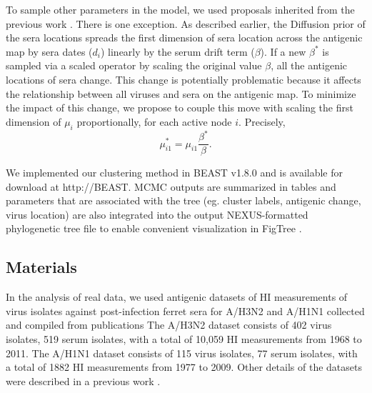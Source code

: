 \documentclass[11pt,oneside,letterpaper]{article}
\begin{document}
To sample other parameters in the model, we used proposals inherited from the previous work \cite{bedford_integrating_2014}. 
There is one exception.
As described earlier, the Diffusion prior of the sera locations \cite{bedford_integrating_2014} spreads the first dimension of sera location across the antigenic map by sera dates ($d_i$) linearly by the serum drift term ($\beta$).
If a new $\beta^{*}$ is sampled via a scaled operator \cite{bedford_integrating_2014} by scaling the original value $\beta$, all the antigenic locations of sera change.
This change is potentially problematic because it affects the relationship between all viruses and sera on the antigenic map.
To minimize the impact of this change, we propose to couple this move with scaling the first dimension of $\mu_i$  proportionally, for each active node $i$. Precisely, 
\begin{equation}
\label{scaleMu1}
 \mu_{i1}^* = \mu_{i1} \frac{ \beta^*}{\beta} .
\end{equation}



We implemented our clustering method in BEAST v1.8.0 and is available for download at http://BEAST.
MCMC outputs are summarized in tables and parameters that are associated with the tree (eg. cluster labels, antigenic change, virus location) are also integrated into the output NEXUS-formatted phylogenetic tree file to enable convenient visualization in FigTree \cite{FIGTREE}.


\subsection*{Materials}

In the analysis of real data, we used antigenic datasets \cite{bedford_integrating_2014} of HI measurements of virus isolates against post-infection ferret sera for A/H3N2 and A/H1N1 collected and compiled from publications \cite{Smith04,Kendal78,Webster79,Nakajima79,Nakajima81,Chakraverty82,Pereira82,Chakraverty86,Cox83,Daniels85,Raymond86,Stevens87,Donatelli93,Hay01,Daum02,McDonald07,Barr10}
The A/H3N2 dataset consists of 402 virus isolates, 519 serum isolates, with a total of 10,059 HI measurements from 1968 to 2011. 
The A/H1N1 dataset consists of 115 virus isolates, 77 serum isolates, with a total of 1882 HI measurements from 1977 to 2009.
Other details of the datasets were described in a previous work \cite{bedford_integrating_2014}.
\end{document}
